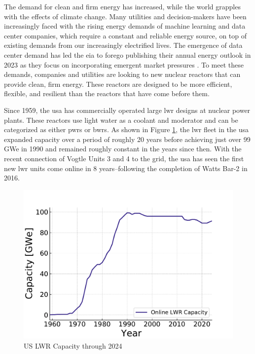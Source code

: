 The demand for clean and firm energy has increased, while the world grapples
with the effects of climate change. Many utilities and decision-makers have
been increasingly faced with the rising energy demands of machine learning and
data center companies, which require a constant and reliable energy source, on
top of existing demands from our increasingly electrified lives. The emergence
of data center demand has led the \gls{eia} to forego publishing their annual
energy outlook in 2023 as they focus on incorporating emergent market pressures
\cite{eia_annual_outlook_canceled_2023}. To meet these demands, companies and
utilities are looking to new nuclear reactors that can provide clean, firm
energy. These reactors are designed to be more efficient, flexible, and
resilient than the reactors that have come before them.

Since 1959, the \gls{usa} has commercially operated large \gls{lwr} designs at
nuclear power plants. These reactors use light water as a coolant and moderator
and can be categorized as either \glspl{pwr} or \glspl{bwr}. As shown in Figure
\ref{fig:online_lwr_cap_2024}, the \gls{lwr} fleet in the \gls{usa} expanded
capacity over a period of roughly 20 years before achieving just over 99 GWe in
1990 and remained roughly constant in the years since then. With the recent
connection of Vogtle Units 3 and 4 to the grid, the \gls{usa} has seen the
first new \gls{lwr} units come online in 8 years--following the completion of
Watts Bar-2 in 2016.

\begin{figure}[H]
    \centering
    \includegraphics[scale=0.8]{images/intro/online_lwr_cap_2024.pdf}
    \caption{US LWR Capacity through 2024 \cite{IAEA_PRIS}}
    \label{fig:online_lwr_cap_2024}
\end{figure}

